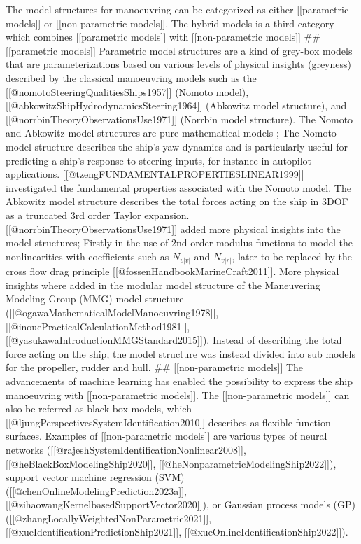 The model structures for manoeuvring can be categorized as either [[parametric models]] or [[non-parametric models]]. The hybrid models is a third category which combines [[parametric models]] with [[non-parametric models]]  
## [[parametric models]]
Parametric model structures are a kind of grey-box models that are parameterizations based on various levels of physical insights (greyness) described by the classical manoeuvring models such as the [[@nomotoSteeringQualitiesShips1957]] (Nomoto model), [[@abkowitzShipHydrodynamicsSteering1964]] (Abkowitz model structure), and [[@norrbinTheoryObservationsUse1971]] (Norrbin model structure). The Nomoto and Abkowitz model structures are pure mathematical models ; The Nomoto model structure describes the ship's yaw dynamics and is particularly useful for predicting a ship's response to steering inputs, for instance in autopilot applications. [[@tzengFUNDAMENTALPROPERTIESLINEAR1999]] investigated the fundamental properties associated with the Nomoto model. The Abkowitz model structure describes the total forces acting on the ship in 3DOF as a truncated 3rd order Taylor expansion. [[@norrbinTheoryObservationsUse1971]] added more physical insights into the model structures; Firstly in the use of 2nd order modulus functions  to model the nonlinearities with coefficients such as $N_{v|v|}$ and $N_{v|r|}$, later to be replaced by the cross flow drag principle [[@fossenHandbookMarineCraft2011]]. More physical insights where added in the modular model structure of the Maneuvering Modeling Group (MMG) model structure ([[@ogawaMathematicalModelManoeuvring1978]], [[@inouePracticalCalculationMethod1981]],[[@yasukawaIntroductionMMGStandard2015]]). Instead of describing the total force acting on the ship, the model structure was instead divided into sub models for the propeller, rudder and hull.
## [[non-parametric models]]
The advancements of machine learning has enabled the possibility to express the ship manoeuvring with [[non-parametric models]]. The [[non-parametric models]] can also be referred as black-box models, which [[@ljungPerspectivesSystemIdentification2010]] describes as flexible function surfaces.
Examples of [[non-parametric models]] are various types of neural networks ([[@rajeshSystemIdentificationNonlinear2008]], [[@heBlackBoxModelingShip2020]], [[@heNonparametricModelingShip2022]]), support vector machine regression (SVM) ([[@chenOnlineModelingPrediction2023a]], [[@zihaowangKernelbasedSupportVector2020]]), or Gaussian process models (GP) ([[@zhangLocallyWeightedNonParametric2021]],[[@xueIdentificationPredictionShip2021]], [[@xueOnlineIdentificationShip2022]]).  

